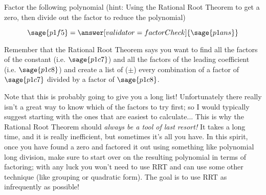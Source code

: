 \documentclass{ximera}
\begin{document}
\begin{problem}
    
    Factor the following polynomial (hint: Using the Rational Root Theorem to get a zero, then divide out the factor to reduce the polynomial)
    
    \[
        \sage{p1f5} = \answer[validator=factorCheck]{\sage{p1ans}}
    \]
    \begin{feedback}
        Remember that the Rational Root Theorem says you want to find all the factors of the constant (i.e. $\sage{p1c7}$) and all the factors of the leading coefficient (i.e. $\sage{p1c8}$) and create a list of ($\pm$) every combination of a factor of $\sage{p1c7}$ divided by a factor of $\sage{p1c8}$. 
        
        Note that this is probably going to give you a long list! Unfortunately there really isn't a great way to know which of the factors to try first; so I would typically suggest starting with the ones that are easiest to calculate... This is why the Rational Root Theorem should \textit{always be a tool of last resort!} It takes a long time, and it is really inefficient, but sometimes it's all you have. In this spirit, once you have found a zero and factored it out using something like polynomial long division, make sure to start over on the resulting polynomial in terms of factoring; with any luck you won't need to use RRT and can use some other technique (like grouping or quadratic form). The goal is to use RRT as infrequently as possible!
    \end{feedback}
    
\end{problem}
\end{document}
